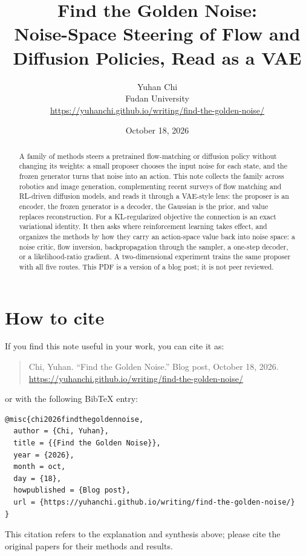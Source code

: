 \documentclass[11pt]{article}
\title{Find the Golden Noise:\\[2pt]
  \large Noise-Space Steering of Flow and Diffusion Policies, Read as a VAE}
\author{Yuhan Chi\\[2pt]
  \small Fudan University\\
  \small\url{https://yuhanchi.github.io/writing/find-the-golden-noise/}}
\date{October 18, 2026}
\begin{document}
\maketitle

\begin{abstract}
\noindent A family of methods steers a pretrained flow-matching or diffusion policy without
changing its weights: a small proposer chooses the input noise for each state, and the frozen
generator turns that noise into an action. This note collects the family across robotics and
image generation, complementing recent surveys of flow matching and RL-driven diffusion
models, and reads it through a VAE-style lens: the proposer is an encoder, the frozen generator is a decoder, the
Gaussian is the prior, and value replaces reconstruction. For a KL-regularized objective the
connection is an exact variational identity. It then asks where reinforcement learning takes
effect, and organizes the methods by how they carry an action-space value back into noise space:
a noise critic, flow inversion, backpropagation through the sampler, a one-step decoder, or a
likelihood-ratio gradient. A two-dimensional experiment trains the same proposer with all five
routes. This PDF is a version of a blog post; it is not peer reviewed.
\end{abstract}




\section*{How to cite}
If you find this note useful in your work, you can cite it as:

\begin{quote}
Chi, Yuhan. ``Find the Golden Noise.'' Blog post, October 18, 2026.
\url{https://yuhanchi.github.io/writing/find-the-golden-noise/}
\end{quote}

or with the following BibTeX entry:

\noindent\begin{minipage}{\linewidth}
\begin{verbatim}
@misc{chi2026findthegoldennoise,
  author = {Chi, Yuhan},
  title = {{Find the Golden Noise}},
  year = {2026},
  month = oct,
  day = {18},
  howpublished = {Blog post},
  url = {https://yuhanchi.github.io/writing/find-the-golden-noise/}
}
\end{verbatim}
\end{minipage}
\medskip

This citation refers to the explanation and synthesis above; please cite the original papers
for their methods and results.
\end{document}
